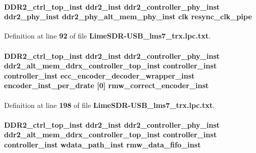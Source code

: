 \paragraph[{resync\+\_\+clk\+\_\+pipe}]{ {\bf D\+D\+R2\+\_\+ctrl\+\_\+top\+\_\+inst} {\bf ddr2\+\_\+inst} {\bf ddr2\+\_\+controller\+\_\+phy\+\_\+inst} {\bf ddr2\+\_\+phy\+\_\+inst} {\bf ddr2\+\_\+phy\+\_\+alt\+\_\+mem\+\_\+phy\+\_\+inst} {\bf clk} resync\+\_\+clk\+\_\+pipe}\label{LimeSDR-USB__lms7__trx_8lpc_8txt_acb71a3968fff57497063fe0696976d23}


Definition at line {\bf 92} of file {\bf Lime\+S\+D\+R-\/\+U\+S\+B\+\_\+lms7\+\_\+trx.\+lpc.\+txt}.

\paragraph[{rmw\+\_\+correct\+\_\+encoder\+\_\+inst}]{ {\bf D\+D\+R2\+\_\+ctrl\+\_\+top\+\_\+inst} {\bf ddr2\+\_\+inst} {\bf ddr2\+\_\+controller\+\_\+phy\+\_\+inst} {\bf ddr2\+\_\+alt\+\_\+mem\+\_\+ddrx\+\_\+controller\+\_\+top\+\_\+inst} {\bf controller\+\_\+inst} {\bf controller\+\_\+inst} {\bf ecc\+\_\+encoder\+\_\+decoder\+\_\+wrapper\+\_\+inst} encoder\+\_\+inst\+\_\+per\+\_\+drate [0] rmw\+\_\+correct\+\_\+encoder\+\_\+inst}\label{LimeSDR-USB__lms7__trx_8lpc_8txt_ac93c2e1b4a21e6cb9b47b372f8f2d2cb}


Definition at line {\bf 198} of file {\bf Lime\+S\+D\+R-\/\+U\+S\+B\+\_\+lms7\+\_\+trx.\+lpc.\+txt}.

\paragraph[{rmw\+\_\+data\+\_\+fifo\+\_\+inst}]{ {\bf D\+D\+R2\+\_\+ctrl\+\_\+top\+\_\+inst} {\bf ddr2\+\_\+inst} {\bf ddr2\+\_\+controller\+\_\+phy\+\_\+inst} {\bf ddr2\+\_\+alt\+\_\+mem\+\_\+ddrx\+\_\+controller\+\_\+top\+\_\+inst} {\bf controller\+\_\+inst} {\bf controller\+\_\+inst} {\bf wdata\+\_\+path\+\_\+inst} rmw\+\_\+data\+\_\+fifo\+\_\+inst}\label{LimeSDR-USB__lms7__trx_8lpc_8txt_aa7aa232b8a541555bf97a05990f3d424}


